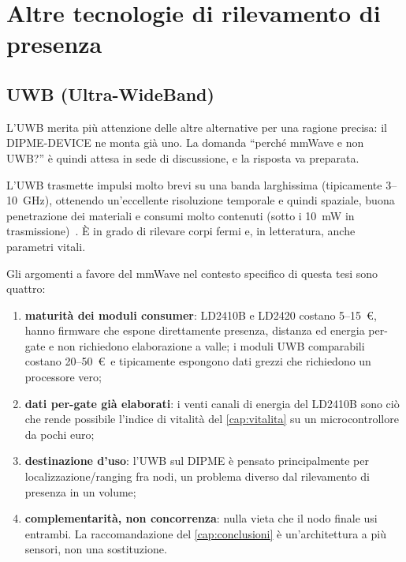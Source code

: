 \section{Altre tecnologie di rilevamento di presenza}
\label{sec:altre-tecnologie}

\subsection{UWB (Ultra-WideBand)}
\label{sec:uwb}

L'UWB merita più attenzione delle altre alternative per una ragione precisa: il
DIPME-DEVICE ne monta già uno. La domanda ``perché mmWave e non UWB?'' è quindi
attesa in sede di discussione, e la risposta va preparata.

L'UWB trasmette impulsi molto brevi su una banda larghissima (tipicamente
3--10~GHz), ottenendo un'eccellente risoluzione temporale e quindi spaziale, buona
penetrazione dei materiali e consumi molto contenuti (sotto i 10~mW in
trasmissione)~\cite{rfwireless}. È in grado di rilevare corpi fermi e, in
letteratura, anche parametri vitali.

Gli argomenti a favore del mmWave nel contesto specifico di questa tesi sono
quattro:

\begin{enumerate}[leftmargin=1.8em,itemsep=2pt]
  \item \textbf{maturità dei moduli consumer}: LD2410B e LD2420 costano 5--15~\euro,
        hanno firmware che espone direttamente presenza, distanza ed energia
        per-gate e non richiedono elaborazione a valle; i moduli UWB comparabili
        costano 20--50~\euro\ e tipicamente espongono dati grezzi che richiedono un
        processore vero;
  \item \textbf{dati per-gate già elaborati}: i venti canali di energia del
        LD2410B sono ciò che rende possibile l'indice di vitalità del
        \cref{cap:vitalita} su un microcontrollore da pochi euro;
  \item \textbf{destinazione d'uso}: l'UWB sul DIPME è pensato principalmente per
        localizzazione/ranging fra nodi, un problema diverso dal rilevamento di
        presenza in un volume;
  \item \textbf{complementarità, non concorrenza}: nulla vieta che il nodo finale
        usi entrambi. La raccomandazione del \cref{cap:conclusioni} è
        un'architettura a più sensori, non una sostituzione.
\end{enumerate}

